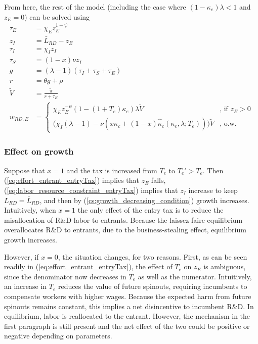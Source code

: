 \documentclass[11pt,english]{article}
\theoremstyle{remark}
\begin{document}
From here, the rest of the model (including the case where $(1-\kappa_e)\lambda < 1$ and $z_E = 0$) can be solved using
\begin{align}
\tau_E &= \chi_E z_E^{1-\psi} \\
z_I &= \bar{L}_{RD} - z_E \label{eq:labor_resource_constraint_entryTax}\\ 
\tau_I &= \chi_I z_I \\
\tau_S &= (1-x) \nu z_I \\
g &= (\lambda - 1) (\tau_I + \tau_S + \tau_E) \\
r &= \theta g + \rho \\
\tilde{V} &= \frac{\tilde{\pi}}{r + \tau_E} \\ 
w_{RD,E} &= \begin{cases}
				\chi_E z_E^{-\psi} (1-(1+T_e)\kappa_e) \lambda \tilde{V} &\textrm{, if } z_E > 0\\
				\Big( \chi_I(\lambda -1) - \nu (x\kappa_c + (1-x)\hat{\bar{\kappa}}_c(\kappa_e,\lambda;T_e))\Big) \tilde{V} &\textrm{, o.w.}
			\end{cases} \label{eq:wage_rd_labor_entryTax}
\end{align}

\subsubsection{Effect on growth}

Suppose that $x = 1$ and the tax is increased from $T_e$ to $T_e' > T_e$. Then (\ref{eq:effort_entrant_entryTax}) implies that $z_E$ falls, (\ref{eq:labor_resource_constraint_entryTax}) implies that $z_I$ increase to keep $L_{RD} = \bar{L}_{RD}$, and then by (\ref{cs:growth_decreasing_condition}) growth increases. Intuitively, when $x = 1$ the only effect of the entry tax is to reduce the misallocation of R\&D labor to entrants. Because the laissez-faire equilibrium overallocates R\&D to entrants, due to the business-stealing effect, equilibrium growth increases.

However, if $x = 0$, the situation changes, for two reasons. First, as can be seen readily in (\ref{eq:effort_entrant_entryTax}), the effect of $T_e$ on $z_E$ is ambiguous, since the denominator now decreases in $T_e$ as well as the numerator. Intuitively, an increase in $T_e$ reduces the value of future spinouts, requiring incumbents to compensate workers with higher wages. Because the expected harm from future spinouts remains constant, this implies a net disincentive to incumbent R\&D. In equilibrium, labor is reallocated to the entrant. However, the mechanism in the first paragraph is still present and the net effect of the two could be positive or negative depending on parameters.
\end{document}
